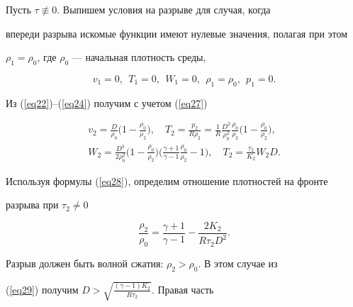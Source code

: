 Пусть $\tau\not\equiv0$. Выпишем условия на разрыве для случая, когда 


впереди разрыва искомые функции имеют нулевые значения, полагая при этом


$\rho_1=\rho_0$, где $\rho_0$ --- начальная плотность среды,


\begin{equation}\label{eq27}


v_1=0,\ \ T_1=0,\ \ W_1=0,\ \ \rho_1=\rho_0,\ \ p_1=0.


\end{equation}


Из (\ref{eq22})--(\ref{eq24}) получим с учетом (\ref{eq27})


\begin{equation}\label{eq28}


\begin{array}{c}


\displaystyle


v_2=\frac{D}{\rho_0}\bigg(1-\frac{\rho_0}{\rho_2}\bigg),\quad


T_2=\frac{p_2}{R\rho_2}=\frac{1}{R}\frac{D^2}{\rho_0^2}\frac{\rho_0}{\rho_2}


\bigg(1-\frac{\rho_0}{\rho_2}\bigg),\\[4mm]


\displaystyle


W_2=\frac{D^3}{2\rho_0^2}\bigg(1-\frac{\rho_0}{\rho_2}\bigg)


\bigg(\frac{\gamma+1}{\gamma-1}\frac{\rho_0}{\rho_2}-1\bigg),\quad


T_2=\frac{\tau_2}{K_2}W_2D.


\end{array}


\end{equation}


Используя формулы (\ref{eq28}), определим отношение плотностей на фронте


разрыва при $\tau_2\ne0$


\begin{equation}\label{eq29}


\frac{\rho_2}{\rho_0}=\frac{\gamma+1}{\gamma-1}-\frac{2K_2}{R\tau_2D^2}.


\end{equation}


Разрыв должен быть волной сжатия: $\rho_2>\rho_0$. В этом случае из


(\ref{eq29}) получим $D>\sqrt{\frac{(\gamma-1)K_2}{R\tau_2}}$. Правая часть


